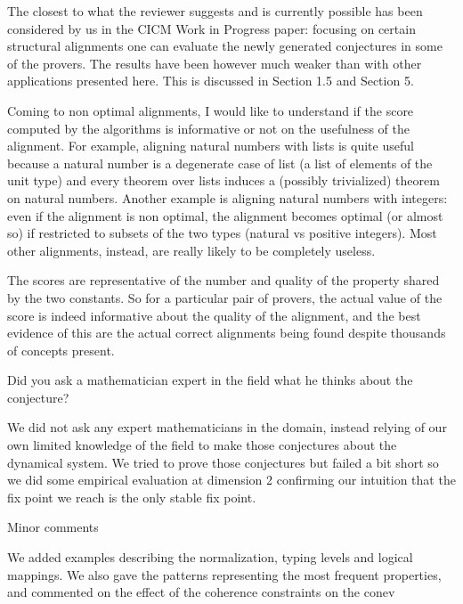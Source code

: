 \documentclass[]{scrartcl}
\begin{document}
The closest to what the reviewer suggests and is currently possible has been 
considered by us in the CICM Work in Progress paper:
focusing on certain structural alignments one can evaluate the newly generated 
conjectures in some of the provers. The results
have been however much weaker than with other applications presented here. This 
is discussed in Section 1.5 and Section 5.

\begin{leftbar}
Coming to non optimal alignments, I would like to understand if the score 
computed by the algorithms is informative or not on the usefulness of the 
alignment. For example, aligning natural numbers with lists is quite useful 
because a natural number is a degenerate case of list (a list of elements of 
the unit type) and every theorem over lists induces a (possibly trivialized) 
theorem on natural numbers. Another example is aligning natural numbers with 
integers: even if the alignment is non optimal, the alignment becomes optimal 
(or almost so) if restricted to subsets of the two types (natural vs positive 
integers). Most other alignments, instead, are really likely to be completely 
useless.
\end{leftbar}

The scores are representative of the number and quality of the property shared 
by the two constants. So for a particular
pair of provers, the actual value of the score is indeed informative about the 
quality of the alignment, and the best
evidence of this are the actual correct alignments being found despite 
thousands of concepts present.


\begin{leftbar}
Did you ask a mathematician expert in the field what he thinks about the 
conjecture?
\end{leftbar}
We did not ask any expert mathematicians in the domain, instead relying of our 
own limited knowledge of the field to make those conjectures about the 
dynamical system.
We tried to prove those conjectures but failed a bit short so we did some 
empirical evaluation at dimension 2 confirming our intuition that the fix point 
we reach is the only stable fix point.

\begin{leftbar}
Minor comments
\end{leftbar}
We added examples describing the normalization, typing levels and logical 
mappings.
We also gave the patterns representing the most frequent properties, and 
commented on the effect of the coherence constraints on the conev
\end{document}
